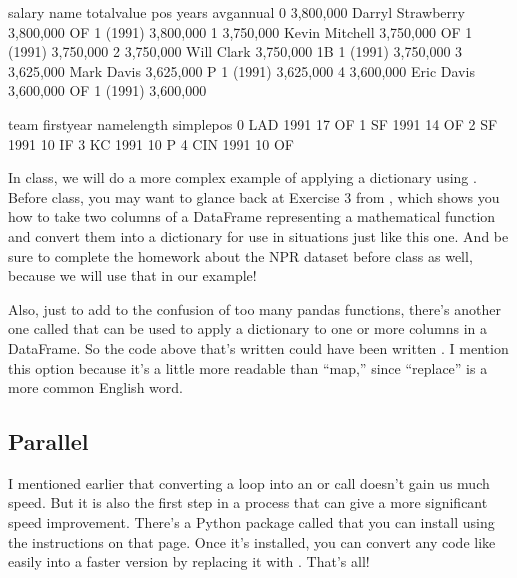 \documentclass[letterpaper,10pt,english]{jupyterBook}
\begin{document}
\begin{sphinxVerbatim}[commandchars=\\\{\}]
        salary               name  total\PYGZus{}value pos     years   avg\PYGZus{}annual  \PYGZbs{}
0  \PYGZdl{} 3,800,000  Darryl Strawberry  \PYGZdl{} 3,800,000  OF  1 (1991)  \PYGZdl{} 3,800,000   
1  \PYGZdl{} 3,750,000     Kevin Mitchell  \PYGZdl{} 3,750,000  OF  1 (1991)  \PYGZdl{} 3,750,000   
2  \PYGZdl{} 3,750,000         Will Clark  \PYGZdl{} 3,750,000  1B  1 (1991)  \PYGZdl{} 3,750,000   
3  \PYGZdl{} 3,625,000         Mark Davis  \PYGZdl{} 3,625,000   P  1 (1991)  \PYGZdl{} 3,625,000   
4  \PYGZdl{} 3,600,000         Eric Davis  \PYGZdl{} 3,600,000  OF  1 (1991)  \PYGZdl{} 3,600,000   

  team  first\PYGZus{}year  name\PYGZus{}length simple\PYGZus{}pos  
0  LAD        1991           17         OF  
1   SF        1991           14         OF  
2   SF        1991           10         IF  
3   KC        1991           10          P  
4  CIN        1991           10         OF  
\end{sphinxVerbatim}

\sphinxAtStartPar
In class, we will do a more complex example of applying a dictionary using .  Before class, you may want to glance back at Exercise 3 from {\hyperref[\detokenize{chapter-2-mathematical-foundations::doc}]{}}, which shows you how to take two columns of a DataFrame representing a mathematical function and convert them into a dictionary for use in situations just like this one.  And be sure to complete the homework about the NPR dataset before class as well, because we will use that in our example!

\sphinxAtStartPar
Also, just to add to the confusion of too many pandas functions, there’s another one called  that can be used to apply a dictionary to one or more columns in a DataFrame.  So the code above that’s written  could have been written .  I mention this option because it’s a little more readable than “map,” since “replace” is a more common English word.


\subsection{Parallel }
\label{\detokenize{chapter-11-processing-rows:parallel-apply}}
\sphinxAtStartPar
I mentioned earlier that converting a loop into an  or  call doesn’t gain us much speed.  But it is also the first step in a process that can give a more significant speed improvement.  There’s a Python package called  that you can install using the instructions on that page.  Once it’s installed, you can convert any code like  easily into a faster version by replacing it with .  That’s all!
\end{document}
